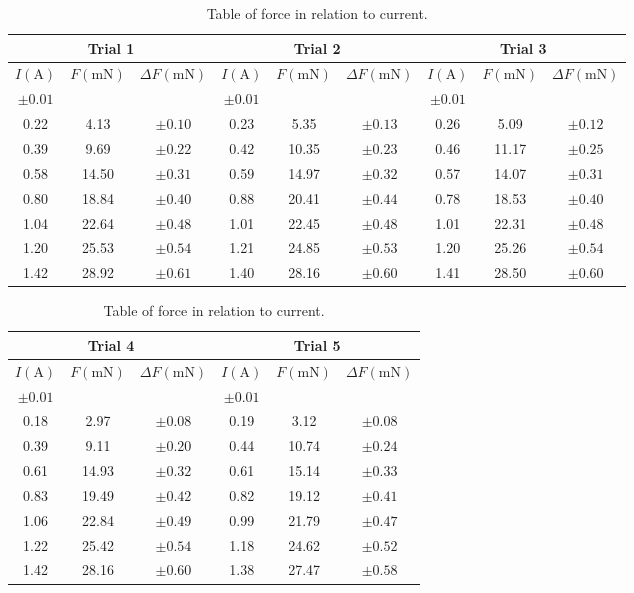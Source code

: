 \begin{table}[H]
	\centering
	\begin{tabular}{|ccc||ccc||ccc|}
		\hline
		\multicolumn{3}{|c||}{Trial 1} & \multicolumn{3}{c||}{Trial 2} & \multicolumn{3}{c|}{Trial 3} \\
		\hline
		$I(\si{\ampere})$ & $F(\si{\milli\newton})$ & $\Delta F(\si{\milli\newton})$ & $I(\si{\ampere})$ & $F(\si{\milli\newton})$ & $\Delta F(\si{\milli\newton})$ & $I(\si{\ampere})$ & $F(\si{\milli\newton})$ & $\Delta F(\si{\milli\newton})$ \\
		$\pm0.01$ & & & $\pm0.01$ & & & $\pm0.01$ & & \\
		\hline
		0.22 & 4.13 & $\pm0.10$ & 0.23 & 5.35 & $\pm0.13$ & 0.26 & 5.09 & $\pm0.12$ \\
		0.39 & 9.69 & $\pm0.22$ & 0.42 & 10.35 & $\pm0.23$ & 0.46 & 11.17 & $\pm0.25$ \\
		0.58 & 14.50 & $\pm0.31$ & 0.59 & 14.97 & $\pm0.32$ & 0.57 & 14.07 & $\pm0.31$ \\
		0.80 & 18.84 & $\pm0.40$ & 0.88 & 20.41 & $\pm0.44$ & 0.78 & 18.53 & $\pm0.40$ \\
		1.04 & 22.64 & $\pm0.48$ & 1.01 & 22.45 & $\pm0.48$ & 1.01 & 22.31 & $\pm0.48$ \\
		1.20 & 25.53 & $\pm0.54$ & 1.21 & 24.85 & $\pm0.53$ & 1.20 & 25.26 & $\pm0.54$ \\
		1.42 & 28.92 & $\pm0.61$ & 1.40 & 28.16 & $\pm0.60$ & 1.41 & 28.50 & $\pm0.60$\\
		\hline
	\end{tabular}
	\begin{tabular}{|ccc||ccc|}
		\hline
		\multicolumn{3}{|c||}{Trial 4} & \multicolumn{3}{c|}{Trial 5} \\
		\hline
		$I(\si{\ampere})$ & $F(\si{\milli\newton})$ & $\Delta F(\si{\milli\newton})$ & $I(\si{\ampere})$ & $F(\si{\milli\newton})$ & $\Delta F(\si{\milli\newton})$ \\
		$\pm0.01$ & & & $\pm0.01$ & & \\
		\hline
		0.18 & 2.97 & $\pm0.08$ & 0.19 & 3.12 & $\pm0.08$ \\
		0.39 & 9.11 & $\pm0.20$ & 0.44 & 10.74 & $\pm0.24$ \\
		0.61 & 14.93 & $\pm0.32$ & 0.61 & 15.14 & $\pm0.33$ \\
		0.83 & 19.49 & $\pm0.42$ & 0.82 & 19.12 & $\pm0.41$ \\
		1.06 & 22.84 & $\pm0.49$ & 0.99 & 21.79 & $\pm0.47$ \\
		1.22 & 25.42 & $\pm0.54$ & 1.18 & 24.62 & $\pm0.52$ \\
		1.42 & 28.16 & $\pm0.60$ & 1.38 & 27.47 & $\pm0.58$ \\
		\hline
	\end{tabular}
	\caption{Table of force in relation to current.}
	\vspace{-3em}
	\label{tab:proc}
\end{table}

